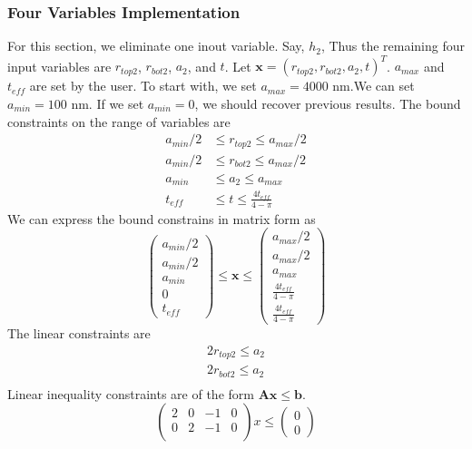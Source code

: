 \documentclass[12pt]{article}
\numberwithin{equation}{section}
\numberwithin{equation}{section}
\begin{document}
\subsubsection {Four Variables Implementation} 
For this section, we eliminate one inout variable. Say, $h_2$, Thus the remaining four input variables are $r_{top2}$, $r_{bot2}$, $a_2$, and $t$.  Let $\mathbf{x} = \left ( r_{top2}, r_{bot2}, a_2, t  \right )^T $. $a_{max}$ and $t_{eff}$ are set by the user.  To start with, we set $a_{max} = 4000$ nm.We can set $a_{min} = 100$ nm.  If we set $a_{min} = 0$, we should recover previous results. The bound constraints on the range of variables are
\begin{align*}
a_{min}/2 & \leq r_{top2} \leq a_{max}/2 \\
a_{min}/2 & \leq r_{bot2} \leq a_{max}/2 \\
a_{min} & \leq a_{2} \leq a_{max} \\
t_{eff}  & \leq t \leq \frac {4t_{eff}}{4-\pi}
\end{align*}
We can express the bound constrains in matrix form as
\begin{equation}
\left(
\begin{matrix}
a_{min}/2\\ 
a_{min}/2\\
a_{min}\\ 
0 \\
t_{eff} 
\end{matrix} \right )
\leq \mathbf{x}
 \leq 
 \left(
\begin{matrix}
a_{max}/2 \\ a_{max}/2 \\ a_{max}  \\ \frac {4t_{eff}}{4-\pi}\\ \frac {4t_{eff}}{4-\pi}
\end{matrix} \right )
\end{equation}
The linear constraints are 
\begin{align*}   
2r_{top2} \leq a_2 \\
2r_{bot2} \leq a_2 \\
\end{align*}
Linear inequality constraints are of the form $\mathbf{A} \mathbf{x} \leq \mathbf{b}$.
\begin{equation}
\left(
\begin{matrix}
2 & 0 & -1 & 0  \\
0 & 2 & -1 & 0  \\
\end{matrix}
\right ) x  \leq \left ( \begin{matrix} 0\\ 0 \end{matrix} \right ) 
\end{equation}
\end{document}
